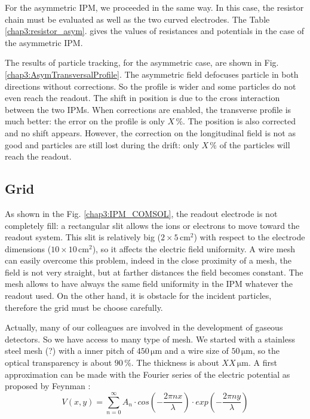 \begin{refsection}
	For the asymmetric IPM, we proceeded in the same way. In this case, the resistor chain must be evaluated as well as the two curved electrodes. The Table \ref{chap3:resistor_asym}. gives the values of resistances and potentials in the case of the asymmetric IPM.

	

	The results of particle tracking, for the asymmetric case, are shown in Fig. \ref{chap3:AsymTransversalProfile}. The asymmetric field defocuses particle in both directions without corrections. So the profile is wider and some particles do not even reach the readout. The shift in position is due to the cross interaction between the two IPMs. When corrections are enabled, the transverse profile is much better: the error on the profile is only $X\,\mathrm{\%}$. The position is also corrected and no shift appears. However, the correction on the longitudinal field is not as good and particles are still lost during the drift: only $X\,\mathrm{\%}$ of the particles will reach the readout.

	

	\subsection{Grid}
	\label{chap3:sec:grid}
	As shown in the Fig. \ref{chap3:IPM_COMSOL}, the readout electrode is not completely fill: a rectangular slit allows the ions or electrons to move toward the readout system. This slit is relatively big ($2\times5\,\mathrm{cm^{2}}$) with respect to the electrode dimensions ($10\times10\,\mathrm{cm^{2}}$), so it affects the electric field uniformity. A wire mesh can easily overcome this problem, indeed in the close proximity of a mesh, the field is not very straight, but at farther distances the field becomes constant. The mesh allows to have always the same field uniformity in the IPM whatever the readout used. On the other hand, it is obstacle for the incident particles, therefore the grid must be choose carefully.

	Actually, many of our colleagues are involved in the development of gaseous detectors. So we have access to many type of mesh. We started with a stainless steel mesh (?) with a inner pitch of $450\,\mathrm{\mu m}$ and a wire size of $50\,\mathrm{\mu m}$, so the optical transparency is about $90\,\mathrm{\%}$. The thickness is about $XX\,\mathrm{\mu m}$. A first approximation can be made with the Fourier series of the electric potential as proposed by Feynman \cite{feynman2011feynman}:
	\begin{equation}
		V(x,y)= \sum^{\infty}_{n=0} A_{n} \cdot cos(-\frac{2\pi n x}{\lambda}) \cdot exp(-\frac{2\pi n y}{\lambda})
	\end{equation}


\end{refsection}
